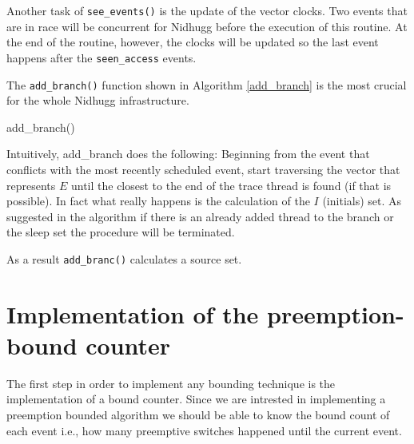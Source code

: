 Another task of \verb|see_events()| is the update of the vector clocks. Two events that are in race will be concurrent for Nidhugg before the execution
of this routine. At the end of the routine, however, the clocks will be updated so the last event happens after the \verb|seen_access| events.

The \verb|add_branch()| function shown in Algorithm \ref{add_branch} is the most crucial for the whole Nidhugg infrastructure.

\begin{algorithm}
    \caption{add\_branch()}
    \label{add_branch}
\end{algorithm}

Intuitively, add\_branch does the following: Beginning from the event that conflicts with the most recently scheduled event, start traversing
the vector that represents $E$ until the closest to the end of the trace thread is found (if that is possible). In fact what really happens is the 
calculation of the
$I$ (initials) set. As suggested in the algorithm if there is an already added thread to the branch or the sleep set the procedure will be terminated.

As a result \verb|add_branc()| calculates a source set.

\section{Implementation of the preemption-bound counter}

The first step in order to implement any bounding technique is the implementation of a bound counter. Since we are intrested in implementing
a preemption bounded algorithm we should be able to know the bound count of each event i.e., how many preemptive switches happened until the current 
event. 

